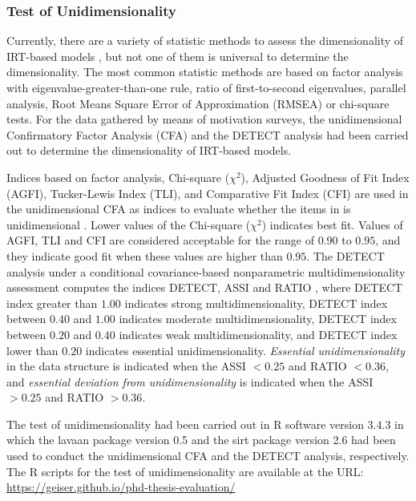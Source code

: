 \subsubsection*{Test of Unidimensionality}

Currently, there are a variety of statistic methods to assess the dimensionality of IRT-based models \cite{Hattie1985, NandakumarYuLiStout1998}, but not one of them is universal to determine the dimensionality. The most common statistic methods are based on factor analysis with eigenvalue-greater-than-one rule, ratio of first-to-second eigenvalues, parallel analysis, Root Means Square Error of Approximation (RMSEA) or chi-square tests. For the data gathered by means of motivation surveys, the unidimensional Confirmatory Factor Analysis (CFA) \cite{Brown2014} and the DETECT analysis \cite{StoutHabingDouglasKimRoussosZhang1996, Zhang2007} had been carried out to determine the dimensionality of IRT-based models.

Indices based on factor analysis, Chi-square (${\chi}^2$), Adjusted Goodness of Fit Index (AGFI), Tucker-Lewis Index (TLI), and Comparative Fit Index (CFI) are used in the unidimensional CFA as indices to evaluate whether the items in  is unidimensional \cite{Brown2014}. Lower values of the Chi-square (${\chi}^2$) indicates best fit. Values of AGFI, TLI and CFI are considered acceptable for the range of $0.90$ to $0.95$, and they indicate good fit when these values are higher than $0.95$. The DETECT analysis under a conditional covariance-based nonparametric multidimensionality assessment computes the indices DETECT, ASSI and RATIO \cite{Zhang2007}, where DETECT index greater than $1.00$ indicates strong multidimensionality, DETECT index between $0.40$ and $1.00$ indicates moderate multidimensionality, DETECT index between $0.20$ and $0.40$ indicates weak multidimensionality, and DETECT index lower than $0.20$ indicates essential unidimensionality. \emph{Essential unidimensionality} in the data structure is indicated when the ASSI $< 0.25$ and RATIO $< 0.36$, and \emph{essential deviation from unidimensionality} is indicated when the ASSI $> 0.25$ and RATIO $> 0.36$.

The test of unidimensionality had been carried out in R software version 3.4.3 \cite{RCoreTeam2017} in which the lavaan package version 0.5 \cite{Rosseel2012} and the sirt package version 2.6 \cite{Robitzsch2018} had been used to conduct the unidimensional CFA and the DETECT analysis, respectively. The R scripts for the test of unidimensionality are available at the URL: \url{https://geiser.github.io/phd-thesis-evaluation/}

